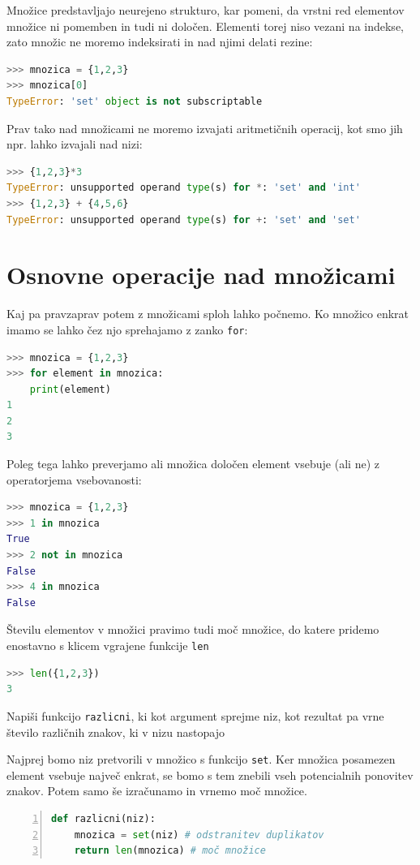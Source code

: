 Množice predstavljajo neurejeno strukturo, kar pomeni, da vrstni red elementov množice ni pomemben in tudi ni določen. Elementi torej niso vezani na indekse, zato množic ne moremo indeksirati in nad njimi delati rezine:
\begin{lstlisting}[language=Python, showstringspaces=false]
>>> mnozica = {1,2,3}
>>> mnozica[0]
TypeError: 'set' object is not subscriptable
\end{lstlisting}
Prav tako nad množicami ne moremo izvajati aritmetičnih operacij, kot smo jih npr. lahko izvajali nad nizi:
\begin{lstlisting}[language=Python, showstringspaces=false]
>>> {1,2,3}*3
TypeError: unsupported operand type(s) for *: 'set' and 'int'
>>> {1,2,3} + {4,5,6}
TypeError: unsupported operand type(s) for +: 'set' and 'set'
\end{lstlisting}

\section{Osnovne operacije nad množicami}

Kaj pa pravzaprav potem z množicami sploh lahko počnemo. Ko množico enkrat imamo se lahko čez njo sprehajamo z zanko \texttt{for}:
\begin{lstlisting}[language=Python, showstringspaces=false]
>>> mnozica = {1,2,3}
>>> for element in mnozica:
	print(element)
1
2
3
\end{lstlisting} 
Poleg tega lahko preverjamo ali množica določen element vsebuje (ali ne) z operatorjema vsebovanosti:
\begin{lstlisting}[language=Python, showstringspaces=false]
>>> mnozica = {1,2,3}
>>> 1 in mnozica
True
>>> 2 not in mnozica
False
>>> 4 in mnozica
False
\end{lstlisting}

Številu elementov v množici pravimo tudi moč množice, do katere pridemo enostavno s klicem vgrajene funkcije \texttt{len}
\begin{lstlisting}[language=Python, showstringspaces=false]
>>> len({1,2,3})
3
\end{lstlisting}

\begin{zgled}
Napiši funkcijo \texttt{razlicni}, ki kot argument sprejme niz, kot rezultat pa vrne število različnih znakov, ki v nizu nastopajo
\end{zgled}
\begin{resitev}
Najprej bomo niz pretvorili v množico s funkcijo \texttt{set}. Ker množica posamezen element vsebuje največ enkrat, se bomo s tem znebili vseh potencialnih ponovitev znakov. Potem samo še izračunamo in vrnemo moč množice.
\begin{lstlisting}[language=Python, showstringspaces=false,numbers=left]
def razlicni(niz):
    mnozica = set(niz) # odstranitev duplikatov
    return len(mnozica) # moč množice
\end{lstlisting}
\end{resitev}

